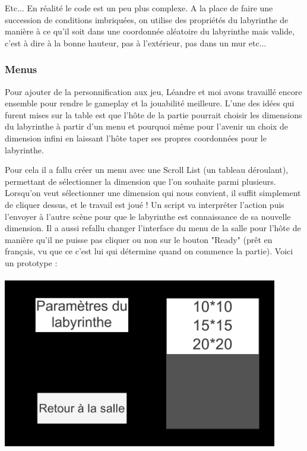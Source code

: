 \documentclass{article}
\begin{document}
Etc... En réalité le code est un peu plus complexe. A la place de faire une succession de conditions imbriquées, on utilise des propriétés du labyrinthe de manière à ce qu'il soit dans une coordonnée aléatoire du labyrinthe mais valide, c'est à dire à la bonne hauteur, pas à l'extérieur, pas dans un mur etc...

\subsubsection{Menus}

Pour ajouter de la personnification aux jeu, Léandre et moi avons travaillé encore ensemble pour rendre le gameplay et la jouabilité meilleure. L'une des idées qui furent mises sur la table est que l'hôte de la partie pourrait choisir les dimensions du labyrinthe à partir d’un menu et pourquoi même pour l'avenir un choix de dimension infini en laissant l'hôte taper ses propres coordonnées pour le labyrinthe. 

Pour cela il a fallu créer un menu avec une Scroll List (un tableau déroulant), permettant de sélectionner la dimension que l'on souhaite parmi plusieurs. Lorsqu'on veut sélectionner une dimension qui nous convient, il suffit simplement de cliquer dessus, et le travail est joué ! Un script va interpréter l'action puis l'envoyer à l'autre scène pour que le labyrinthe est connaissance de sa nouvelle dimension. Il a aussi refallu changer l'interface du menu de la salle pour l'hôte de manière qu'il ne puisse pas cliquer ou non sur le bouton "Ready" (prêt en français, vu que ce c'est lui qui détermine quand on commence la partie). Voici un prototype :
\\
\\

\includegraphics[width=0.9\textwidth]{menustevetaillelabyrinthe.png}\par\vspace{0.75cm}
 
\end{document}
